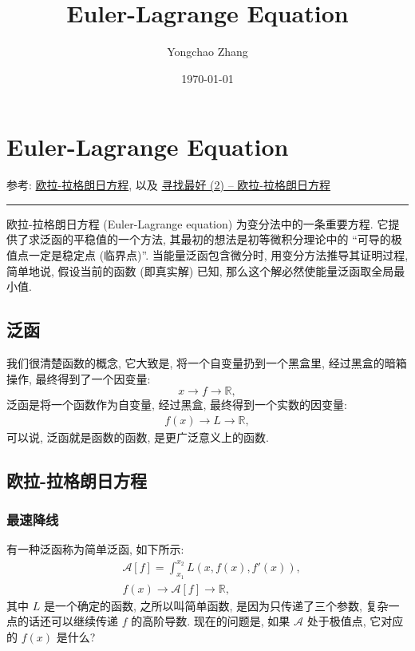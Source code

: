\documentclass[cn,hazy,blue,14pt,screen]{./cls/elegantnote}
\title{Euler-Lagrange Equation}
\author{Yongchao Zhang}
\institute{NORTHWEST UNIVERSITY}
\date{\today}
\begin{document}
\maketitle


\section{Euler-Lagrange Equation}
参考: \href{https://blog.csdn.net/zhongyuchen/article/details/72820909}{欧拉-拉格朗日方程}, 以及 \href{https://www.cnblogs.com/bigmonkey/p/9519387.html}{寻找最好 (2) -- 欧拉-拉格朗日方程}

\rule[1pt]{14.3cm}{0.05em}

欧拉-拉格朗日方程 (Euler-Lagrange equation) 为变分法中的一条重要方程. 它提供了求泛函的平稳值的一个方法, 其最初的想法是初等微积分理论中的 ``可导的极值点一定是稳定点 (临界点)”. 当能量泛函包含微分时, 用变分方法推导其证明过程, 简单地说, 假设当前的函数 (即真实解) 已知, 那么这个解必然使能量泛函取全局最小值.

\subsection{泛函}
我们很清楚函数的概念, 它大致是, 将一个自变量扔到一个黑盒里,  经过黑盒的暗箱操作, 最终得到了一个因变量:
\begin{equation*}
 	x \rightarrow \boxed{f} \rightarrow \mathbb{R}, 
\end{equation*}
泛函是将一个函数作为自变量, 经过黑盒, 最终得到一个实数的因变量:
\begin{align*}
 	f(x) \rightarrow \boxed{L} \rightarrow \mathbb{R},
\end{align*}
可以说, 泛函就是函数的函数, 是更广泛意义上的函数.

\subsection{欧拉-拉格朗日方程}
\subsubsection{最速降线}
有一种泛函称为简单泛函, 如下所示:
\begin{align*}
 	&\mathcal{A}[f] = \int_{x_1}^{x_2} L(x, f(x),f'(x)),\\
 	&f(x)\rightarrow \boxed{\mathcal{A}[f]}\rightarrow \mathbb{R},
\end{align*}
其中 $ L $ 是一个确定的函数, 之所以叫简单函数, 是因为只传递了三个参数, 复杂一点的话还可以继续传递 $ f $ 的高阶导数. 现在的问题是, 如果 $ \mathcal{A} $ 处于极值点, 它对应的 $ f(x) $ 是什么?
\end{document}
